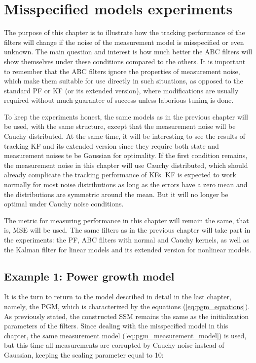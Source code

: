 \chapter{Misspecified models experiments}
\label{chap:misspecified}

The purpose of this chapter is to illustrate how the tracking performance of the filters will change if the noise of the measurement model is misspecified or even unknown. The main question and interest is how much better the ABC filters will show themselves under these conditions compared to the others. It is important to remember that the ABC filters ignore the properties of measurement noise, which make them suitable for use directly in such situations, as opposed to the standard PF or KF (or its extended version), where modifications are usually required without much guarantee of success unless laborious tuning is done.

To keep the experiments honest, the same models as in the previous chapter will be used, with the same structure, except that the measurement noise will be Cauchy distributed. At the same time, it will be interesting to see the results of tracking KF and its extended version since they require both state and measurement noises te be Gaussian for optimality. If the first condition remains, the measurement noise in this chapter will use Cauchy distributed, which should already complicate the tracking performance of KFs. KF is expected to work normally for most noise distributions as long as the errors have a zero mean and the distributions are symmetric around the mean. But it will no longer be optimal under Cauchy noise conditions.

The metric for measuring performance in this chapter will remain the same, that is, MSE will be used. The same filters as in the previous chapter will take part in the experiments: the PF, ABC filters with normal and Cauchy kernels, as well as the Kalman filter for linear models and its extended version for nonlinear models.

\section{Example 1: Power growth model}
It is the turn to return to the model described in detail in the last chapter, namely, the PGM, which is characterized by the equations (\ref{eq:pgm_equations}). As previously stated, the constructed SSM remains the same as the initialization parameters of the filters. Since dealing with the misspecified model in this chapter, the same measurement model (\ref{eq:pgm_measurement_model}) is used, but this time all measurements are corrupted by Cauchy noise instead of Gaussian, keeping the scaling parameter equal to 10:

